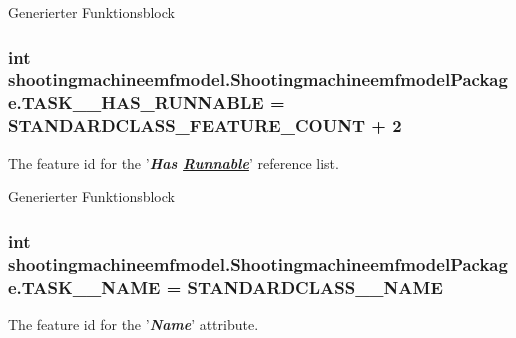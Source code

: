 Generierter Funktionsblock  \hypertarget{interfaceshootingmachineemfmodel_1_1_shootingmachineemfmodel_package_a6dfa46683e73ddc332624916d8e636cf}{
\subsubsection[{T\-A\-S\-K\-\_\-\-\_\-\-H\-A\-S\-\_\-\-R\-U\-N\-N\-A\-B\-L\-E}]{\setlength{\rightskip}{0pt plus 5cm}int shootingmachineemfmodel.\-Shootingmachineemfmodel\-Package.\-T\-A\-S\-K\-\_\-\-\_\-\-H\-A\-S\-\_\-\-R\-U\-N\-N\-A\-B\-L\-E = {\bf S\-T\-A\-N\-D\-A\-R\-D\-C\-L\-A\-S\-S\-\_\-\-F\-E\-A\-T\-U\-R\-E\-\_\-\-C\-O\-U\-N\-T} + 2}}\label{interfaceshootingmachineemfmodel_1_1_shootingmachineemfmodel_package_a6dfa46683e73ddc332624916d8e636cf}
The feature id for the '{\itshape {\bfseries Has \hyperlink{interfaceshootingmachineemfmodel_1_1_runnable}{Runnable}}}' reference list.

Generierter Funktionsblock  \hypertarget{interfaceshootingmachineemfmodel_1_1_shootingmachineemfmodel_package_a62650844ac979a7c21389bde0193fea2}{
\subsubsection[{T\-A\-S\-K\-\_\-\-\_\-\-N\-A\-M\-E}]{\setlength{\rightskip}{0pt plus 5cm}int shootingmachineemfmodel.\-Shootingmachineemfmodel\-Package.\-T\-A\-S\-K\-\_\-\-\_\-\-N\-A\-M\-E = {\bf S\-T\-A\-N\-D\-A\-R\-D\-C\-L\-A\-S\-S\-\_\-\-\_\-\-N\-A\-M\-E}}}\label{interfaceshootingmachineemfmodel_1_1_shootingmachineemfmodel_package_a62650844ac979a7c21389bde0193fea2}
The feature id for the '{\itshape {\bfseries Name}}' attribute.

